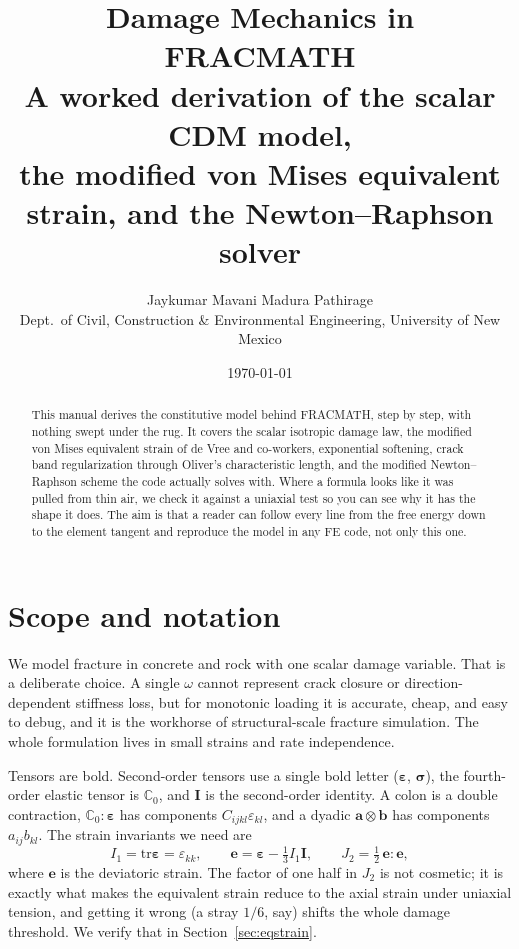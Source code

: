 \documentclass[11pt]{article}
\title{\textbf{Damage Mechanics in FRACMATH}\\[2pt]
\large A worked derivation of the scalar CDM model,\\
the modified von Mises equivalent strain, and the Newton--Raphson solver}
\author{Jaykumar Mavani \quad\textbar\quad Madura Pathirage\\
\small Dept.\ of Civil, Construction \& Environmental Engineering, University of New Mexico}
\date{\today}
\newcommand{\eps}{\bm{\varepsilon}}
\newcommand{\sig}{\bm{\sigma}}
\newcommand{\C}{\mathbb{C}}
\newcommand{\Id}{\bm{I}}
\newcommand{\tr}{\mathrm{tr}}
\begin{document}
\maketitle
\thispagestyle{fancy}

\begin{abstract}
\noindent
This manual derives the constitutive model behind FRACMATH, step by step, with nothing
swept under the rug. It covers the scalar isotropic damage law, the modified von Mises
equivalent strain of de Vree and co-workers, exponential softening, crack band
regularization through Oliver's characteristic length, and the modified Newton--Raphson
scheme the code actually solves with. Where a formula looks like it was pulled from thin
air, we check it against a uniaxial test so you can see why it has the shape it does.
The aim is that a reader can follow every line from the free energy down to the element
tangent and reproduce the model in any FE code, not only this one.
\end{abstract}

\tableofcontents
\bigskip

\section{Scope and notation}

We model fracture in concrete and rock with one scalar damage variable. That is a
deliberate choice. A single $\omega$ cannot represent crack closure or direction-dependent
stiffness loss, but for monotonic loading it is accurate, cheap, and easy to debug, and it
is the workhorse of structural-scale fracture simulation. The whole formulation lives in
small strains and rate independence.

Tensors are bold. Second-order tensors use a single bold letter ($\eps$, $\sig$), the
fourth-order elastic tensor is $\C_0$, and $\Id$ is the second-order identity. A colon is a
double contraction, $\C_0:\eps$ has components $C_{ijkl}\varepsilon_{kl}$, and a dyadic
$\bm a \otimes \bm b$ has components $a_{ij}b_{kl}$. The strain invariants we need are
%
\begin{equation}
I_1 = \tr\eps = \varepsilon_{kk},
\qquad
\bm e = \eps - \tfrac{1}{3} I_1 \Id,
\qquad
J_2 = \tfrac{1}{2}\,\bm e : \bm e ,
\label{eq:invariants}
\end{equation}
%
where $\bm e$ is the deviatoric strain. The factor of one half in $J_2$ is not cosmetic; it
is exactly what makes the equivalent strain reduce to the axial strain under uniaxial
tension, and getting it wrong (a stray $1/6$, say) shifts the whole damage threshold. We
verify that in Section~\ref{sec:eqstrain}.
\end{document}
